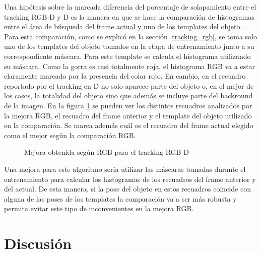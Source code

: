 Una hipótesis sobre la marcada diferencia del porcentaje de solapamiento entre el tracking RGB-D y D es la manera en que se hace la comparación de histogramas entre el área de búsqueda del frame actual y uno de los templates del objeto. . Para esta comparación, como se explicó en la sección \ref{tracking_rgb}, se toma solo uno de los templates del objeto tomados en la etapa de entrenamiento junto a su correspondiente máscara. Para este template se calcula el histograma utilizando su máscara. Como la gorra es casi totalmente roja, el histograma RGB va a estar claramente marcado por la presencia del color rojo. En cambio, en el recuadro reportado por el tracking en D no solo aparece parte del objeto o, en el mejor de los casos, la totalidad del objeto sino que además se incluye parte del backround de la imagen. En la figura \ref{mejora_rgb_en_tracking_rgbd} se pueden ver los distintos recuadros analizados por la mejora RGB, el recuadro del frame anterior y el template del objeto utilizado en la comparación. Se marca además cuál es el recuadro del frame actual elegido como el mejor según la comparación RGB.

\begin{figure}
	\caption{Mejora obtenida según RGB para el tracking RGB-D}
	\label{mejora_rgb_en_tracking_rgbd}
\end{figure}

Una mejora para este algoritmo sería utilizar las máscaras tomadas durante el entrenamiento para calcular los histogramas de los recuadros del frame anterior y del actual. De esta manera, si la pose del objeto en estos recuadros coincide con alguna de las poses de los templates la comparación va a ser más robusta y permita evitar este tipo de inconvenientes en la mejora RGB. 






\section{Discusión}